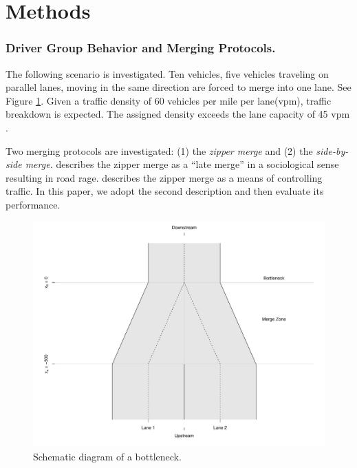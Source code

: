 \documentclass[Proceedings]{ascelike}
\begin{document}
\section{Methods}

\subsubsection{Driver Group Behavior and Merging Protocols.} 

The following scenario is investigated. Ten vehicles, five vehicles traveling on  parallel lanes, moving in the same direction are forced to merge into one lane. See Figure \ref{schematic}. Given a traffic density of 60 vehicles per mile per lane(vpm), traffic breakdown is expected.  The assigned density exceeds the lane capacity of 45 vpm \cite{HCM2000}. 


Two merging protocols are investigated: (1) the \emph{zipper merge} and (2) the \emph{side-by-side merge.}  describes the  zipper merge as a ``late merge'' in a sociological sense resulting in road rage.  describes the zipper merge as a means of controlling traffic. In this paper, we adopt the second description and then evaluate its performance. 


\begin{figure}
\centering
\includegraphics[width = 5.5in]{Rplot02.pdf}
\caption{Schematic diagram of a bottleneck.}
\label{schematic}
\end{figure}
\end{document}
